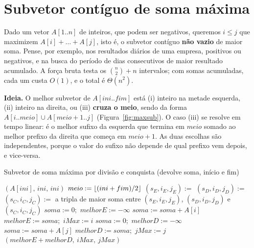 \section{Subvetor contíguo de soma máxima}\label{sec:maxsub}
Dado um vetor $A[1..n]$ de inteiros, que podem ser negativos, queremos $i\le j$ que maximizem $A[i]+\dots+A[j]$, isto é, o subvetor contíguo \textbf{não vazio} de maior soma. Pense, por exemplo, nos resultados diários de uma empresa, positivos ou negativos, e na busca do período de dias consecutivos de maior resultado acumulado. A força bruta testa os $\binom{n}{2}+n$ intervalos; com somas acumuladas, cada um custa $O(1)$, e o total é $\Theta(n^2)$.

\textbf{Ideia.} O melhor subvetor de $A[ini..fim]$ está (i) inteiro na metade esquerda, (ii) inteiro na direita, ou (iii) \textbf{cruza o meio}, sendo da forma $A[i..meio]\cup A[meio+1..j]$ (Figura~\ref{fig:maxsub}). O caso (iii) se resolve em tempo linear: é o melhor sufixo da esquerda que termina em $meio$ somado ao melhor prefixo da direita que começa em $meio+1$. As duas escolhas são independentes, porque o valor do sufixo não depende de qual prefixo vem depois, e vice-versa.
\begin{pseudo}{Subvetor de soma máxima por divisão e conquista (devolve soma, início e fim)}
\begin{algorithmic}
   \State \Return $(A[ini],\,ini,\,ini)$ 
  \EndIf
  \State $meio:=\lfloor(ini+fim)/2\rfloor$
  \State $(s_E,i_E,j_E):=$ 
  \State $(s_D,i_D,j_D):=$ 
  \State $(s_C,i_C,j_C):=$ 
  \State \Return a tripla de maior soma entre $(s_E,i_E,j_E)$, $(s_D,i_D,j_D)$ e $(s_C,i_C,j_C)$
\EndFunction
{}
  \State $soma:=0$;\ $melhorE:=-\infty$
    \State $soma:=soma+A[i]$
     \State $melhorE:=soma$;\ $iMax:=i$ \EndIf
  \EndFor
  \State $soma:=0$;\ $melhorD:=-\infty$
    \State $soma:=soma+A[j]$
     \State $melhorD:=soma$;\ $jMax:=j$ \EndIf
  \EndFor
  \State \Return $(melhorE+melhorD,\ iMax,\ jMax)$
\EndFunction
\end{algorithmic}
\end{pseudo}

